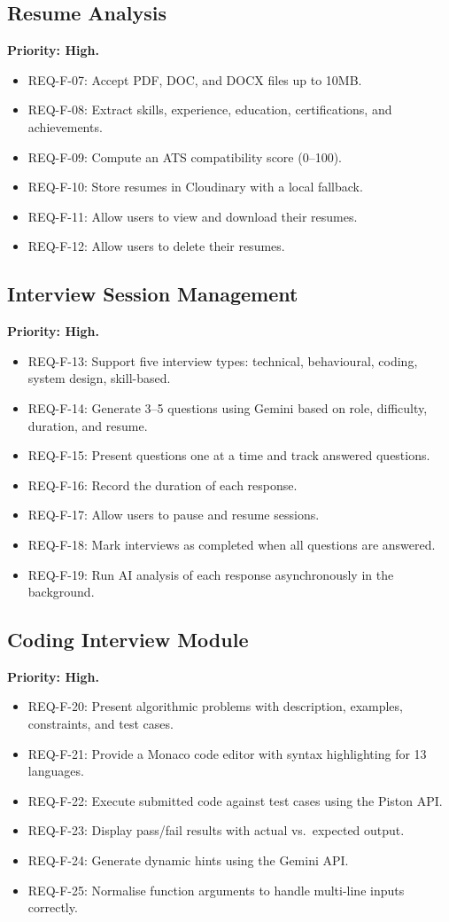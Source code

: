 \subsection{Resume Analysis}
\textbf{Priority: High.}
\begin{itemize}
  \item REQ-F-07: Accept PDF, DOC, and DOCX files up to 10MB.
  \item REQ-F-08: Extract skills, experience, education, certifications, and achievements.
  \item REQ-F-09: Compute an ATS compatibility score (0--100).
  \item REQ-F-10: Store resumes in Cloudinary with a local fallback.
  \item REQ-F-11: Allow users to view and download their resumes.
  \item REQ-F-12: Allow users to delete their resumes.
\end{itemize}

\subsection{Interview Session Management}
\textbf{Priority: High.}
\begin{itemize}
  \item REQ-F-13: Support five interview types: technical, behavioural, coding, system design, skill-based.
  \item REQ-F-14: Generate 3--5 questions using Gemini based on role, difficulty, duration, and resume.
  \item REQ-F-15: Present questions one at a time and track answered questions.
  \item REQ-F-16: Record the duration of each response.
  \item REQ-F-17: Allow users to pause and resume sessions.
  \item REQ-F-18: Mark interviews as completed when all questions are answered.
  \item REQ-F-19: Run AI analysis of each response asynchronously in the background.
\end{itemize}

\subsection{Coding Interview Module}
\textbf{Priority: High.}
\begin{itemize}
  \item REQ-F-20: Present algorithmic problems with description, examples, constraints, and test cases.
  \item REQ-F-21: Provide a Monaco code editor with syntax highlighting for 13 languages.
  \item REQ-F-22: Execute submitted code against test cases using the Piston API.
  \item REQ-F-23: Display pass/fail results with actual vs.\ expected output.
  \item REQ-F-24: Generate dynamic hints using the Gemini API.
  \item REQ-F-25: Normalise function arguments to handle multi-line inputs correctly.
\end{itemize}

